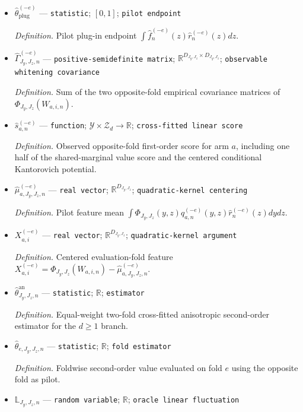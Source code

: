 \documentclass{article}
\begin{document}
\begin{itemize}
  \item \(\widehat\theta_{\mathrm{plug}}^{(-e)}\) --- \texttt{statistic}; \([0,1]\); \texttt{pilot endpoint}
  \par\smallskip\noindent\emph{Definition.} Pilot plug-in endpoint \(\int\widehat f_n^{(-e)}(z)\widehat r_n^{(-e)}(z)dz\).
  \item \(\widehat\Gamma_{J_y,J_z,n}^{(-e)}\) --- \texttt{positive-\allowbreak{}semidefinite matrix}; \(\mathbb R^{D_{J_y,J_z}\times D_{J_y,J_z}}\); \texttt{observable whitening covariance}
  \par\smallskip\noindent\emph{Definition.} Sum of the two opposite-fold empirical covariance matrices of \(\Phi_{J_y,J_z}(W_{a,i,n})\).
  \item \(\widehat s_{a,n}^{(-e)}\) --- \texttt{function}; \(\mathcal Y\times\mathcal Z_d\to\mathbb R\); \texttt{cross-\allowbreak{}fitted linear score}
  \par\smallskip\noindent\emph{Definition.} Observed opposite-fold first-order score for arm \(a\), including one half of the shared-marginal value score and the centered conditional Kantorovich potential.
  \item \(\widehat\mu_{a,J_y,J_z,n}^{(-e)}\) --- \texttt{real vector}; \(\mathbb R^{D_{J_y,J_z}}\); \texttt{quadratic-\allowbreak{}kernel centering}
  \par\smallskip\noindent\emph{Definition.} Pilot feature mean \(\int\Phi_{J_y,J_z}(y,z)\widehat q_{a,n}^{(-e)}(y,z)\widehat r_n^{(-e)}(z)dydz\).
  \item \(X_{a,i}^{(-e)}\) --- \texttt{real vector}; \(\mathbb R^{D_{J_y,J_z}}\); \texttt{quadratic-\allowbreak{}kernel argument}
  \par\smallskip\noindent\emph{Definition.} Centered evaluation-fold feature \(X_{a,i}^{(-e)}=\Phi_{J_y,J_z}(W_{a,i,n})-\widehat\mu_{a,J_y,J_z,n}^{(-e)}\).
  \item \(\widehat\theta^{\mathrm{an}}_{J_y,J_z,n}\) --- \texttt{statistic}; \(\mathbb R\); \texttt{estimator}
  \par\smallskip\noindent\emph{Definition.} Equal-weight two-fold cross-fitted anisotropic second-order estimator for the \(d\ge1\) branch.
  \item \(\widehat\theta_{e,J_y,J_z,n}\) --- \texttt{statistic}; \(\mathbb R\); \texttt{fold estimator}
  \par\smallskip\noindent\emph{Definition.} Foldwise second-order value evaluated on fold \(e\) using the opposite fold as pilot.
  \item \(\mathbb L_{J_y,J_z,n}\) --- \texttt{random variable}; \(\mathbb R\); \texttt{oracle linear fluctuation}

\end{itemize}
\end{document}

